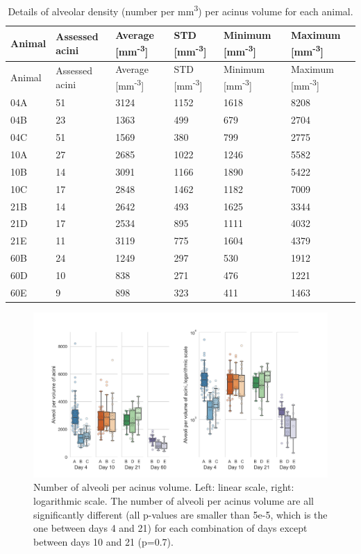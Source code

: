 \documentclass[
  american,
]{article}
\begin{document}
\begin{longtable}[]{@{}llllll@{}}
\caption{Details of alveolar density (number per mm\textsuperscript{3}) per acinus volume for each animal. \label{tbl:density}}\tabularnewline
\toprule
Animal & Assessed acini & Average {[}mm\textsuperscript{-3}{]} & STD {[}mm\textsuperscript{-3}{]} & Minimum {[}mm\textsuperscript{-3}{]} & Maximum {[}mm\textsuperscript{-3}{]}\tabularnewline
\midrule
\endfirsthead
\toprule
Animal & Assessed acini & Average {[}mm\textsuperscript{-3}{]} & STD {[}mm\textsuperscript{-3}{]} & Minimum {[}mm\textsuperscript{-3}{]} & Maximum {[}mm\textsuperscript{-3}{]}\tabularnewline
\midrule
\endhead
04A & 51 & 3124 & 1152 & 1618 & 8208\tabularnewline
04B & 23 & 1363 & 499 & 679 & 2704\tabularnewline
04C & 51 & 1569 & 380 & 799 & 2775\tabularnewline
10A & 27 & 2685 & 1022 & 1246 & 5582\tabularnewline
10B & 14 & 3091 & 1166 & 1890 & 5422\tabularnewline
10C & 17 & 2848 & 1462 & 1182 & 7009\tabularnewline
21B & 14 & 2642 & 493 & 1625 & 3344\tabularnewline
21D & 17 & 2534 & 895 & 1111 & 4032\tabularnewline
21E & 11 & 3119 & 775 & 1604 & 4379\tabularnewline
60B & 24 & 1249 & 297 & 530 & 1912\tabularnewline
60D & 10 & 838 & 271 & 476 & 1221\tabularnewline
60E & 9 & 898 & 323 & 411 & 1463\tabularnewline
\bottomrule
\end{longtable}

\begin{figure}
\hypertarget{fig:05}{%
\centering
\includegraphics{images/fig05.png}
\caption{Number of alveoli per acinus volume.
Left: linear scale, right: logarithmic scale.
The number of alveoli per acinus volume are all significantly different (all p-values are smaller than 5e-5, which is the one between days 4 and 21) for each combination of days except between days 10 and 21 (p=0.7).}\label{fig:05}
}
\end{figure}
\end{document}
